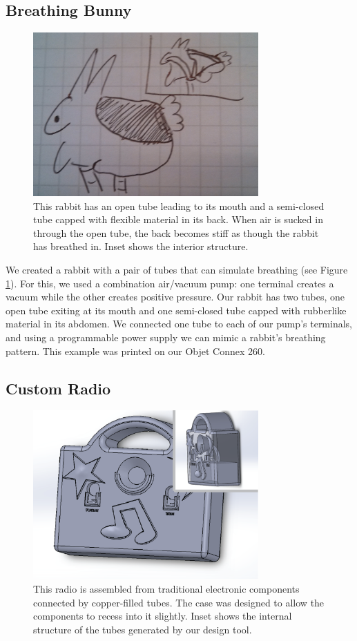 \subsection{Breathing Bunny}

\begin{figure}[h]
\centering
    \includegraphics[width=3.4in]{figures/placeholder/bunny.jpg}
\caption{This rabbit has an open tube leading to its mouth and a semi-closed tube capped with flexible material in its back.  When air is sucked in through the open tube, the back becomes stiff as though the rabbit has breathed in.  Inset shows the interior structure.}
\label{fig:breathe}
\end{figure}

We created a rabbit with a pair of tubes that can simulate breathing (see Figure \ref{fig:breathe}).  For this, we used a combination air/vacuum pump: one terminal creates a vacuum while the other creates positive pressure.  Our rabbit has two tubes, one open tube exiting at its mouth and one semi-closed tube capped with rubberlike material in its abdomen.  We connected one tube to each of our pump's terminals, and using a programmable power supply we can mimic a rabbit's breathing pattern.  This example was printed on our Objet Connex 260. 

\subsection{Custom Radio}

\begin{figure}[h]
\centering
    \includegraphics[width=3.4in]{figures/radio.png}
\caption{This radio is assembled from traditional electronic components connected by copper-filled tubes.  The case was designed to allow the components to recess into it slightly.  Inset shows the internal structure of the tubes generated by our design tool.}
\label{fig:radio}
\end{figure}

